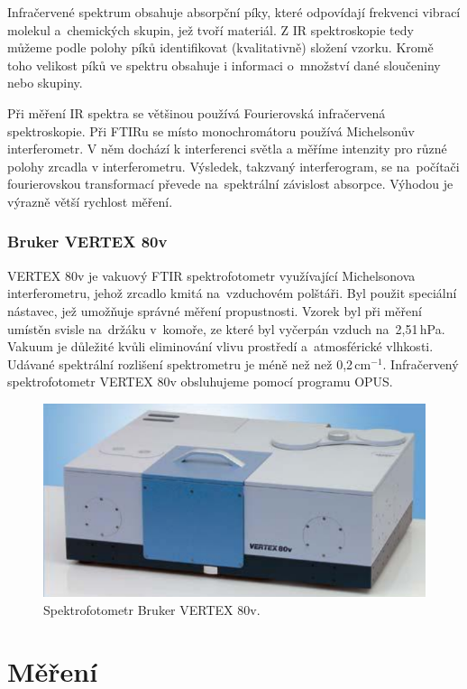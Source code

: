 \documentclass[12pt]{article}
\begin{document}
Infračervené spektrum obsahuje absorpční píky, které odpovídají frekvenci vibrací molekul a~chemických skupin, jež tvoří materiál. Z IR spektroskopie tedy můžeme podle polohy píků identifikovat (kvalitativně) složení vzorku. Kromě toho velikost píků ve spektru obsahuje i informaci o~množství dané sloučeniny nebo skupiny.

Při měření IR spektra se většinou používá Fourierovská infračervená spektroskopie. Při FTIRu se místo mono\-chromátoru používá Michelsonův interferometr. V něm dochází k interferenci světla a měříme intenzity pro různé polohy zrcadla v interferometru. Výsledek, takzvaný interferogram, se na~počítači fourierovskou transformací převede na~spektrální závislost absorpce. Výhodou je výrazně větší rychlost měření.

\subsubsection{Bruker VERTEX 80v}
VERTEX 80v je vakuový FTIR spektrofotometr využívající Michelsonova interferometru, jehož zrcadlo kmitá na~vzduchovém polštáři. Byl použit speciální nástavec, jež umožňuje správné měření propustnosti. Vzorek byl při měření umístěn svisle na~držáku v~komoře, ze které byl vyčerpán vzduch na~2,51\,hPa. Vakuum je důležité kvůli eliminování vlivu prostředí a~atmosférické vlhkosti. Udávané spektrální rozlišení spektrometru je méně než než 0,2\,cm$^{-1}$. Infračervený spektrofotometr VERTEX 80v obsluhujeme pomocí programu OPUS. 

\begin{figure}
  \centering
  \includegraphics[width=120mm]{vertex80v.png}
  \caption{Spektrofotometr Bruker VERTEX 80v.}
  \label{verteximg}
\end{figure}


\section{Měření}
\end{document}
